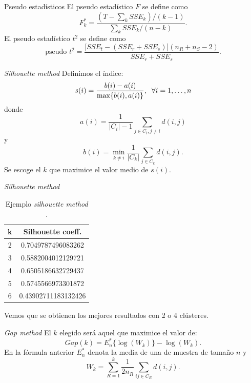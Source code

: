 \documentclass[spanish]{beamer}
\begin{document}
\begin{frame}{Pseudo estadísticos}
	El pseudo estadístico $ F $ se define como
	\[
	F^*_k = \frac{(T-\sum_k SSE_k) / (k-1)}{\sum_k SSE_k / (n-k)}.
	\]
	El pseudo estadístico $ t^2 $ se define como
	\[
	\text{pseudo }t^2 = \frac{\lbrack SSE_t - (SSE_r + SSE_s)\rbrack(n_R + n_S - 2)}{SSE_r + SSE_s}.
	\]
\end{frame}

\begin{frame}{\textit{Silhouette method}}
	Definimos el índice:
	\[
	s(i) = \frac{b(i)-a(i)}{\max\{b(i), a(i)\}}, \hspace{2mm} \forall i = 1, \dots, n
	\] 
	donde 
	\[
	a(i) = \frac{1}{|C_i|-1}\sum_{j\in C_i, j \neq i} d(i,j) 
	\]	y
	\[
	b(i) = \min_{k \neq i} \frac{1}{|C_k|} \sum_{j \in C_k} d(i,j).
	\] 
	Se escoge el $ k $ que maximice el valor medio de $ s(i) $.
\end{frame}

\begin{frame}{\textit{Silhouette method}}
	\begin{table}[h!]
		\centering
		\begin{tabular}{cc} 
			\hline
			k & Silhouette coeff. \\
			\hline
			2 &  0.7049787496083262 \\			 
			3 & 0.5882004012129721 \\	
			4 &  0.6505186632729437 \\
			5 &  0.5745566973301872 \\
			6 & 0.43902711183132426 \\
			\hline
		\end{tabular}
		\caption{Ejemplo \textit{silhouette method} \cite{silouetteGraph}.}
	\end{table}
	Vemos que se obtienen los mejores resultados con 2 o 4 clústeres.
\end{frame}

\begin{frame}{\textit{Gap method}}
	El $ k $ elegido será aquel que maximice el valor de:
	\[
	Gap(k) = E^*_n\{ \log(W_k)\} - \log(W_k).
	\]
	En la fórmula anterior $ E^*_n $ denota la media de una de muestra de tamaño $ n $ y 
	\[
	W_k = \sum_{R = 1}^{k}\frac{1}{2 n_R}\sum_{i j \in C_R} d(i,j).
	\]
\end{frame}
\end{document}
